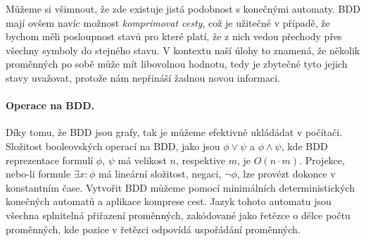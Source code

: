 Můžeme si všimnout, že zde existuje jistá podobnost s konečnými automaty. BDD mají ovšem navíc možnost \textit{komprimovat cesty}, což je užitečné v případě, že bychom měli posloupnost stavů pro které platí, že z nich vedou přechody přes všechny symboly do stejného stavu. V kontextu naší úlohy to znamená, že několik proměnných po sobě může mít libovolnou hodnotu, tedy je zbytečné tyto jejich stavy uvažovat, protože nám nepřináší žadnou novou informaci. 

\paragraph{Operace na BDD.} Díky tomu, že BDD jsou grafy, tak je můžeme efektivně ukládádat v počítači. Složitost booleovských operací na BDD, jako jsou $ \phi \vee \psi $ a $ \phi \wedge \psi $, kde BDD reprezentace formulí $ \phi$, $\psi$ má velikost $n$, respektive $m$, je $O(n \cdot m)$. Projekce, nebo-li formule $\exists x : \phi$ má lineární složitost, negaci, $\neg \phi$, lze provézt dokonce v konstantním čase. Vytvořit BDD můžeme pomocí minimálních deterministických konečných automatů a aplikace komprese cest. Jazyk tohoto automatu jsou všechna splnitelná přiřazení proměnných, zakódované jako řetězce o délce počtu proměnných, kde pozice v řetězci odpovídá uspořádání proměnných. 

